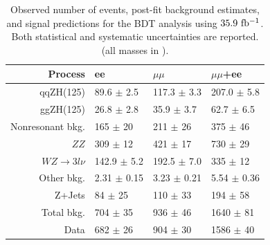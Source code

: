 \begin{table}[hbtp]
  \caption{Observed number of events, post-fit background estimates, and signal 
  predictions for the BDT analysis using $35.9~\mathrm{fb^{-1}}$. Both statistical and systematic uncertainties are reported.
  (all masses in \GeV).
  \label{tab:BDTsel}}
  \begin{center}
{\footnotesize
  \begin{tabular}{rlll}
\hline 
Process & ee & $\mu\mu$ & $\mu\mu$+ee \\
\hline
qqZH(125)             &   89.6 $\pm$  2.5 &  117.3 $\pm$  3.3 &  207.0 $\pm$    5.8 \\
ggZH(125)             &   26.8 $\pm$  2.8 &   35.9 $\pm$  3.7 &   62.7 $\pm$    6.5 \\
\hline
Nonresonant bkg.      &    165 $\pm$   20 &    211 $\pm$   26 &    375 $\pm$	 46 \\ 
$ZZ$                  &    309 $\pm$   12 &    421 $\pm$   17 &    730 $\pm$	 29 \\ 
$WZ\rightarrow3l\nu$  &  142.9 $\pm$  5.2 &  192.5 $\pm$  7.0 &    335 $\pm$	 12 \\ 
Other bkg.            &   2.31 $\pm$ 0.15 &   3.23 $\pm$ 0.21 &   5.54 $\pm$   0.36 \\ 
Z+Jets                &     84 $\pm$   25 &    110 $\pm$   33 &    194 $\pm$	 58 \\ 
\hline 
Total bkg.            &    704 $\pm$   35 &    936 $\pm$   46 &   1640 $\pm$     81 \\
\hline 
Data                  &    682 $\pm$   26 &    904 $\pm$   30 &   1586 $\pm$     40 \\
\hline
  \end{tabular}
}
  \end{center}
\end{table}
\setlength{\tabcolsep}{6pt}

